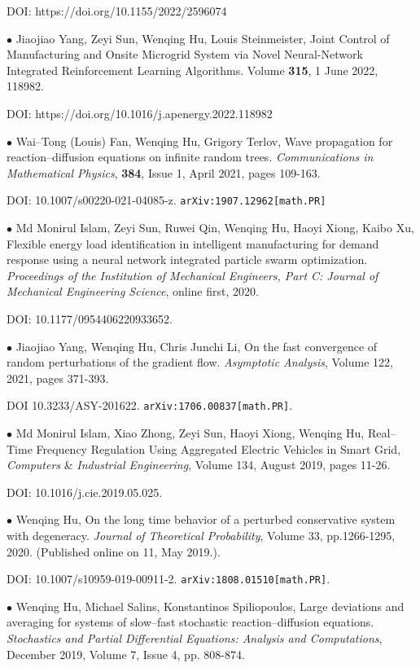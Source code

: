 \documentclass[margin,line]{res}
\begin{document}
\begin{resume}
DOI: https://doi.org/10.1155/2022/2596074

$\bullet$ Jiaojiao Yang, Zeyi Sun, Wenqing Hu, Louis Steinmeister, 
Joint Control of Manufacturing and Onsite Microgrid System via Novel Neural-Network Integrated Reinforcement Learning Algorithms. 
Volume \textbf{315}, 1 June 2022, 118982.

DOI: https://doi.org/10.1016/j.apenergy.2022.118982

$\bullet$ Wai--Tong (Louis) Fan, Wenqing Hu, Grigory Terlov, Wave propagation for reaction--diffusion equations on infinite random trees. \textit{Communications in Mathematical Physics}, \textbf{384}, Issue 1, April 2021, pages 109-163. 

DOI: 10.1007/s00220-021-04085-z. \verb"arXiv:1907.12962[math.PR]"

$\bullet$ Md Monirul Islam, Zeyi Sun, Ruwei Qin, Wenqing Hu, Haoyi Xiong, Kaibo Xu, Flexible energy load identification in intelligent manufacturing for demand response using a neural network integrated particle swarm optimization. \textit{Proceedings of the Institution of Mechanical Engineers, Part C: Journal of Mechanical Engineering Science}, online first, 2020.

DOI: 10.1177/0954406220933652. 

$\bullet$ Jiaojiao Yang, Wenqing Hu, Chris Junchi Li, On the fast convergence of random perturbations of the gradient flow. \textit{Asymptotic Analysis}, Volume 122, 2021, pages 371-393.

DOI 10.3233/ASY-201622. \verb"arXiv:1706.00837[math.PR]".

$\bullet$ Md Monirul Islam, Xiao Zhong, Zeyi Sun, Haoyi Xiong, Wenqing Hu, Real--Time Frequency Regulation Using Aggregated Electric Vehicles in Smart Grid, \textit{Computers} \& \textit{Industrial Engineering}, Volume 134, August 2019, pages 11-26.

DOI: 10.1016/j.cie.2019.05.025.


$\bullet$ Wenqing Hu, On the long time behavior of a perturbed conservative system with degeneracy.  
\textit{Journal of Theoretical Probability}, Volume 33, pp.1266-1295, 2020. (Published online on 11, May 2019.).

DOI: 10.1007/s10959-019-00911-2. \verb"arXiv:1808.01510[math.PR]".



$\bullet$ Wenqing Hu, Michael Salins, Konstantinos Spiliopoulos,
Large deviations and averaging for systems of slow--fast stochastic reaction--diffusion equations.
\textit{Stochastics and  Partial Differential Equations: Analysis and Computations}, December 2019, Volume 7, Issue 4, pp. 808-874.


\end{resume}
\end{document}
